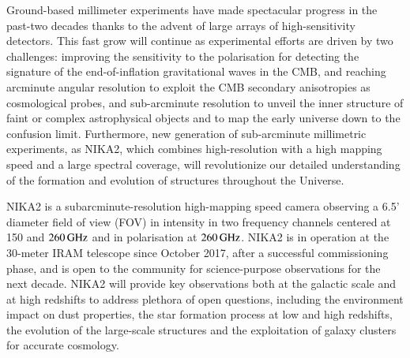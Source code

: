 Ground-based millimeter experiments have made spectacular progress in
the past-two decades thanks to the advent of large arrays of
high-sensitivity detectors. %
This fast grow will continue as experimental efforts are
driven by two challenges: improving the sensitivity to the
polarisation for detecting the signature of
the end-of-inflation gravitational waves in the CMB, and reaching
arcminute angular resolution to exploit the CMB secondary anisotropies
as cosmological probes, and sub-arcminute resolution to unveil the
inner structure of faint or complex astrophysical objects and to map
the early universe down to the confusion limit. Furthermore, new
generation of sub-arcminute millimetric experiments, as NIKA2, which
combines high-resolution with a high mapping speed and a large spectral
coverage, will revolutionize our detailed understanding of the
formation and evolution of structures throughout the Universe.
%
%

NIKA2 is a subarcminute-resolution high-mapping speed camera
observing a 6.5' diameter field of view (FOV) in intensity in two
frequency channels centered at 150 and $260\,\rm{GHz}$ and in
polarisation at $260\, \rm{GHz}$. NIKA2 is in operation at the
30-meter IRAM telescope since October 2017, after a successful
commissioning phase, and is
open to the community for science-purpose observations for the next
decade. NIKA2 will provide key observations both at the galactic scale
and at high redshifts to address plethora of open questions, including
the environment impact on dust properties, the star formation process
at low and high redshifts, the evolution of the large-scale structures
and the exploitation of galaxy clusters for accurate cosmology.
%
%


